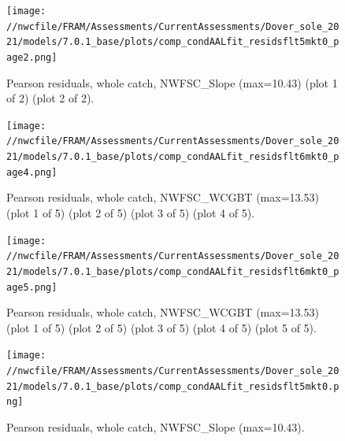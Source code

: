 \documentclass[11pt,
  english,
  a4paper,
]{article}
\begin{document}
\tagmcend\tagstructend


\begin{figure}
\centering
\texttt{[image: //nwcfile/FRAM/Assessments/CurrentAssessments/Dover\_sole\_2021/models/7.0.1\_base/plots/comp\_condAALfit\_residsflt5mkt0\_page2.png]}
\caption{Pearson residuals, whole catch, NWFSC\_Slope (max=10.43) (plot 1 of 2) (plot 2 of 2).\label{fig:comp_condAALfit_residsflt5mkt0_page2}}
\end{figure}

\tagmcend\tagstructend


\begin{figure}
\centering
\texttt{[image: //nwcfile/FRAM/Assessments/CurrentAssessments/Dover\_sole\_2021/models/7.0.1\_base/plots/comp\_condAALfit\_residsflt6mkt0\_page4.png]}
\caption{Pearson residuals, whole catch, NWFSC\_WCGBT (max=13.53) (plot 1 of 5) (plot 2 of 5) (plot 3 of 5) (plot 4 of 5).\label{fig:comp_condAALfit_residsflt6mkt0_page4}}
\end{figure}

\tagmcend\tagstructend


\begin{figure}
\centering
\texttt{[image: //nwcfile/FRAM/Assessments/CurrentAssessments/Dover\_sole\_2021/models/7.0.1\_base/plots/comp\_condAALfit\_residsflt6mkt0\_page5.png]}
\caption{Pearson residuals, whole catch, NWFSC\_WCGBT (max=13.53) (plot 1 of 5) (plot 2 of 5) (plot 3 of 5) (plot 4 of 5) (plot 5 of 5).\label{fig:comp_condAALfit_residsflt6mkt0_page5}}
\end{figure}

\tagmcend\tagstructend


\begin{figure}
\centering
\texttt{[image: //nwcfile/FRAM/Assessments/CurrentAssessments/Dover\_sole\_2021/models/7.0.1\_base/plots/comp\_condAALfit\_residsflt5mkt0.png]}
\caption{Pearson residuals, whole catch, NWFSC\_Slope (max=10.43).\label{fig:comp_condAALfit_residsflt5mkt0}}
\end{figure}
\end{document}
